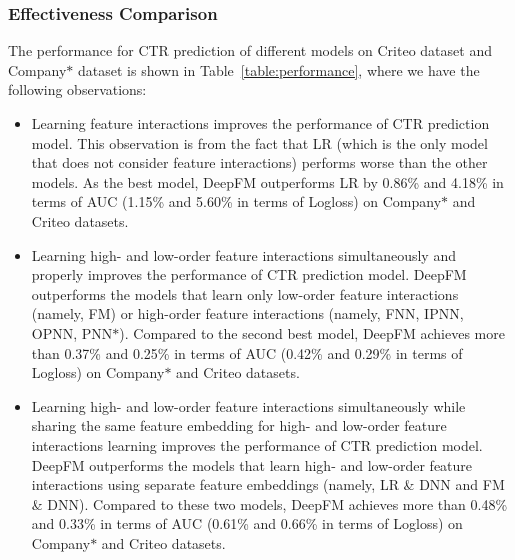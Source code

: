 \subsubsection{Effectiveness Comparison}
The performance for CTR prediction of different models on Criteo dataset and Company$\ast$ dataset is shown in Table~\ref{table:performance}, where we have the following observations:
\begin{itemize}
\item Learning feature interactions improves the performance of CTR prediction model. This observation is from the fact that LR (which is the only model that does not consider feature interactions) performs worse than the other models. As the best model, DeepFM outperforms LR by 0.86\% and 4.18\% in terms of AUC (1.15\% and 5.60\% in terms of Logloss) on Company$\ast$ and Criteo datasets.
\item Learning high- and low-order feature interactions simultaneously and properly improves the performance of CTR prediction model. DeepFM outperforms the models that learn only low-order feature interactions (namely, FM) or high-order feature interactions (namely, FNN, IPNN, OPNN, PNN$\ast$). Compared to the second best model, DeepFM achieves more than 0.37\% and 0.25\% in terms of AUC (0.42\% and 0.29\% in terms of Logloss) on Company$\ast$ and Criteo datasets.
\item Learning high- and low-order feature interactions simultaneously while sharing the same feature embedding for high- and low-order feature interactions learning improves the performance of CTR prediction model. DeepFM outperforms the models that learn high- and low-order feature interactions using separate feature embeddings (namely, LR \& DNN and FM \& DNN). Compared to these two models, DeepFM achieves more than 0.48\% and 0.33\% in terms of AUC (0.61\% and 0.66\% in terms of Logloss) on Company$\ast$ and Criteo datasets.
\end{itemize}

